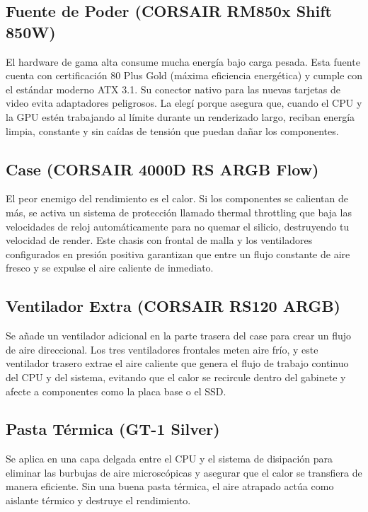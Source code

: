 \documentclass[14pt,a4paper]{extarticle}
\begin{document}
\subsection*{\centering Fuente de Poder (CORSAIR RM850x Shift 850W)}
El hardware de gama alta consume mucha energía bajo carga pesada. Esta fuente cuenta con certificación 80 Plus Gold (máxima eficiencia energética) y cumple con el estándar moderno ATX 3.1. Su conector nativo para las nuevas tarjetas de video evita adaptadores peligrosos. La elegí porque asegura que, cuando el CPU y la GPU estén trabajando al límite durante un renderizado largo, reciban energía limpia, constante y sin caídas de tensión que puedan dañar los componentes.

\subsection*{\centering Case (CORSAIR 4000D RS ARGB Flow)}
El peor enemigo del rendimiento es el calor. Si los componentes se calientan de más, se activa un sistema de protección llamado thermal throttling que baja las velocidades de reloj automáticamente para no quemar el silicio, destruyendo tu velocidad de render. Este chasis con frontal de malla y los ventiladores configurados en presión positiva garantizan que entre un flujo constante de aire fresco y se expulse el aire caliente de inmediato.

\subsection*{\centering Ventilador Extra (CORSAIR RS120 ARGB)}
Se añade un ventilador adicional en la parte trasera del case para crear un flujo de aire direccional. Los tres ventiladores frontales meten aire frío, y este ventilador trasero extrae el aire caliente que genera el flujo de trabajo continuo del CPU y del sistema, evitando que el calor se recircule dentro del gabinete y afecte a componentes como la placa base o el SSD.

\subsection*{\centering Pasta Térmica (GT-1 Silver)}
Se aplica en una capa delgada entre el CPU y el sistema de disipación para eliminar las burbujas de aire microscópicas y asegurar que el calor se transfiera de manera eficiente. Sin una buena pasta térmica, el aire atrapado actúa como aislante térmico y destruye el rendimiento.
\end{document}
